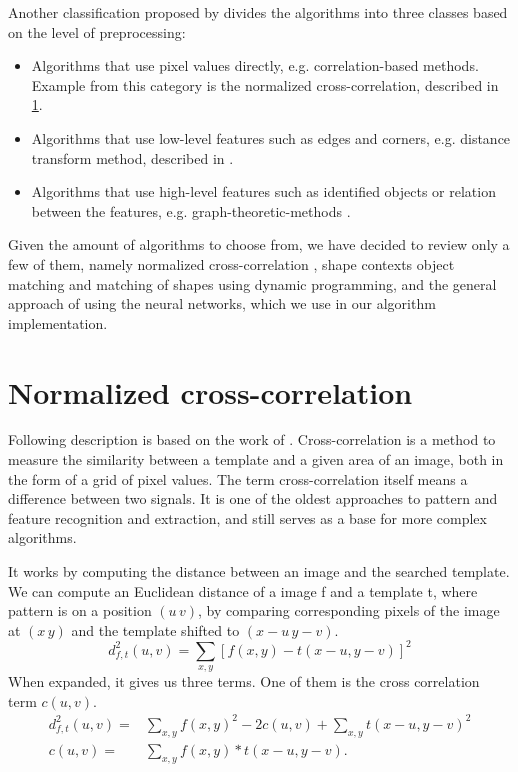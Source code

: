 Another classification proposed by \citet{distanceTransform} divides the algorithms into three classes based on the level of preprocessing:
\begin{itemize}
\item Algorithms that use pixel values directly, e.g. correlation-based methods. Example from this category is the normalized cross-correlation, described in \cref{normalizedCC}.
\item Algorithms that use low-level features such as edges and corners, e.g. distance transform method, described in \citet{distanceTransform}.
\item Algorithms that use high-level features such as identified objects or relation between the features, e.g. graph-theoretic-methods \cite{graph}.
\end{itemize}

Given the amount of algorithms to choose from, we have decided to review only a few of them, namely normalized cross-correlation , shape contexts object matching and matching of shapes using dynamic programming, and the general approach of using the neural networks, which we use in our algorithm implementation.

\section{Normalized cross-correlation}
\label{normalizedCC}
Following description is based on the work of \cite{crossCorrLewis}.
Cross-correlation is a method to measure the similarity between a template and a given area of an image, both in the form of a grid of pixel values. The term cross-correlation itself means a difference between two signals. It is one of the oldest approaches to pattern and feature recognition and extraction, and still serves as a base for more complex algorithms.

It works by computing the distance between an image and the searched template. We can compute an Euclidean distance of a image f and a template t, where pattern is on a position $(u\,v)$, by comparing corresponding pixels of the image at $(x\,y)$ and the template shifted to $(x-u\,y-v)$.
\[d_{f,t}^{2}(u,v)=\sum_{x,y} [ f(x,y) - t(x-u, y-v) ]^{2}\]
When expanded, it gives us three terms. One of them is the cross correlation term $c(u,v)$.
\begin{align*}
d_{f,t}^{2}(u,v)=&\sum_{x,y} f(x,y)^{2} - 2c(u,v) + \sum_{x,y} t(x-u, y-v)^2 \\
c(u,v)=&\sum_{x,y} f(x,y) * t(x-u, y-v).
\end{align*}

